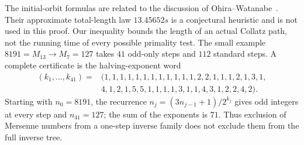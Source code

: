 \documentclass[11pt,a4paper]{article}
\theoremstyle{definition}
\theoremstyle{remark}
\numberwithin{equation}{section}
\begin{document}
The initial-orbit formulas are related to the discussion of
Ohira--Watanabe~\cite{R014}. Their approximate total-length
law $13.45652s$ is a conjectural heuristic and is not used in this proof.
Our inequality bounds the length of an actual Collatz path, not the
running time of every possible primality test.
The small example $8191=M_{13}\longrightarrow M_7=127$ takes $41$
odd-only steps and $112$ standard steps. A complete certificate is the
halving-exponent word
\[
\begin{split}
(k_1,\ldots,k_{41})={}&(1,1,1,1,1,1,1,1,1,1,1,1,2,2,1,1,1,2,1,3,1,\\
 &4,1,2,1,5,5,1,1,1,1,3,1,1,4,3,1,2,2,4,2).
\end{split}
\]
Starting with $n_0=8191$, the recurrence
$n_j=(3n_{j-1}+1)/2^{k_j}$ gives odd integers at every step and
$n_{41}=127$; the sum of the exponents is $71$.
Thus exclusion of Mersenne numbers from a one-step inverse family does
not exclude them from the full inverse tree.
\end{document}

